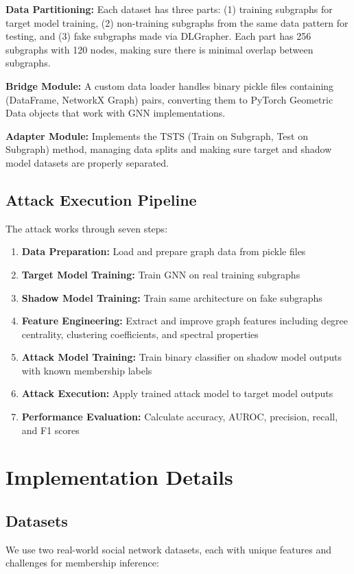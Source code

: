 \documentclass{article}
\begin{document}
\textbf{Data Partitioning:} Each dataset has three parts: (1) training subgraphs for target model training, (2) non-training subgraphs from the same data pattern for testing, and (3) fake subgraphs made via DLGrapher. Each part has 256 subgraphs with 120 nodes, making sure there is minimal overlap between subgraphs.

\textbf{Bridge Module:} A custom data loader handles binary pickle files containing (DataFrame, NetworkX Graph) pairs, converting them to PyTorch Geometric Data objects that work with GNN implementations.

\textbf{Adapter Module:} Implements the TSTS (Train on Subgraph, Test on Subgraph) method, managing data splits and making sure target and shadow model datasets are properly separated.

\subsection{Attack Execution Pipeline}
The attack works through seven steps:
\begin{enumerate}
\item \textbf{Data Preparation:} Load and prepare graph data from pickle files
\item \textbf{Target Model Training:} Train GNN on real training subgraphs
\item \textbf{Shadow Model Training:} Train same architecture on fake subgraphs
\item \textbf{Feature Engineering:} Extract and improve graph features including degree centrality, clustering coefficients, and spectral properties
\item \textbf{Attack Model Training:} Train binary classifier on shadow model outputs with known membership labels
\item \textbf{Attack Execution:} Apply trained attack model to target model outputs
\item \textbf{Performance Evaluation:} Calculate accuracy, AUROC, precision, recall, and F1 scores
\end{enumerate} 

\section{Implementation Details}
\subsection{Datasets}
We use two real-world social network datasets, each with unique features and challenges for membership inference:
\end{document}
